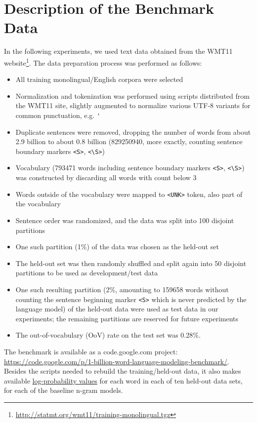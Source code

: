 \documentclass[11pt,letterpaper]{article}
\begin{document}
\section{Description of the Benchmark Data}

In the following experiments, we used text data obtained from the WMT11 website\footnote{\url{http://statmt.org/wmt11/training-monolingual.tgz}}. The data preparation process was performed as follows:
\begin{itemize}\addtolength{\itemsep}{-0.5\baselineskip}
\item All training monolingual/English corpora were selected
\item Normalization and tokenization was performed using scripts distributed from the WMT11 site, slightly augmented to normalize various UTF-8 variants for common punctuation, e.g. \verb+'+
\item Duplicate sentences were removed, dropping the number of words from about 2.9 billion to about 0.8 billion (829250940, more exactly, counting sentence boundary markers \verb+<S>+, \verb+<\S>+)
\item Vocabulary (793471 words including sentence boundary markers \verb+<S>+, \verb+<\S>+) was constructed by discarding all words with count below 3
\item Words outside of the vocabulary were mapped to \verb+<UNK>+ token, also part of the vocabulary
\item Sentence order was randomized, and the data was split into 100 disjoint partitions
\item One such partition (1\%) of the data was chosen as the held-out set
\item The held-out set was then randomly shuffled and split again into 50 disjoint partitions to be used as development/test data
\item One such resulting partition (2\%, amounting to 159658 words without counting the sentence beginning marker \verb+<S>+ which is never predicted by the language model) of the held-out data were used as test data in our experiments; the remaining partitions are reserved for future experiments
\item The out-of-vocabulary (OoV) rate on the test set was 0.28\%.
\end{itemize}

The benchmark is available as a code.google.com project:
\url{https://code.google.com/p/1-billion-word-language-modeling-benchmark/}.
Besides the scripts needed to rebuild the training/held-out data, it also makes
available \href{https://drive.google.com/file/d/0B3u4EqGe3BUeMWhPS1hkdDZvTjA/edit?usp=sharing}{log-probability values} for each word in each of ten held-out data sets, for each of the baseline n-gram models.
\end{document}

